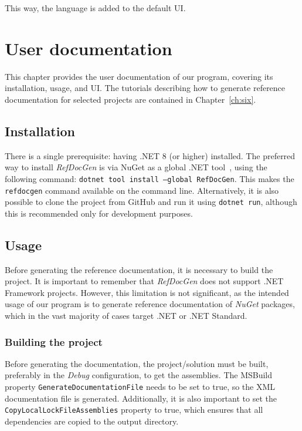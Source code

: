 This way, the language is added to the default UI.

\chapter{User documentation}

This chapter provides the user documentation of our program, covering its installation, usage, and UI.
The tutorials describing how to generate reference documentation for selected projects are contained in Chapter~\ref{ch:six}.

\section{Installation}

There is a single prerequisite: having .NET 8 (or higher) installed.
The preferred way to install \textit{RefDocGen} is via NuGet as a global .NET tool~\cite{dotnet_tools}, using the following command:
\texttt{dotnet tool install --global RefDocGen}.
This makes the \texttt{refdocgen} command available on the command line.
Alternatively, it is also possible to clone the project from GitHub and run it using \texttt{dotnet run}, although this is recommended only for development purposes.

\section{Usage}
\label{sec:user-docs-usage}

Before generating the reference documentation, it is necessary to build the project.
It is important to remember that \textit{RefDocGen} does not support .NET Framework projects. 
However, this limitation is not significant, as the intended usage of our program is to generate reference documentation of \textit{NuGet} packages, 
which in the vast majority of cases target .NET or .NET Standard.

\subsection*{Building the project}

Before generating the documentation, the project/solution must be built, preferably in the \textit{Debug} configuration, to get the assemblies.
The MSBuild property \texttt{GenerateDocumentationFile} needs to be set to true, so the XML documentation file is generated.
Additionally, it is also important to set the \texttt{CopyLocalLockFileAssemblies} property to true, which ensures that all dependencies are copied to the output directory. 

